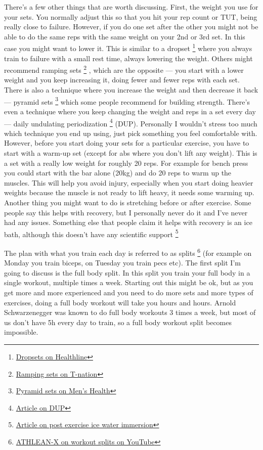 \documentclass[openany, 12pt]{book}
\begin{document}
        There's a few other things that are worth discussing. First, the weight you use for your sets. You normally adjust this so that you hit your rep count or TUT, being really close to failure.
        However, if you do one set after the other you might not be able to do the same reps with the same weight on your 2nd or 3rd set. In this case you might want to lower it. This is similar to
        a dropset
        \footnote{\href{https://www.healthline.com/nutrition/what-is-a-drop-set}{Dropsets on Healthline}}
        where you always train to failure with a small rest time, always lowering the weight. Others might recommend ramping sets
        \footnote{\href{https://www.t-nation.com/training/thibaudeau-on-ramping/}{Ramping sets on T-nation}}
        , which are the opposite --- you start with a lower weight and you keep increasing it, doing fewer and fewer reps with each set. There is also a technique where you increase the weight and then
        decrease it back --- pyramid sets
        \footnote{\href{https://www.menshealth.com/fitness/a36317637/pyramid-sets/}{Pyramid sets on Men's Health}} which some people recommend for building strength. There's even a technique
        where you keep changing the weight and reps in a set every day --- daily undulating periodization
        \footnote{\href{https://pubmed.ncbi.nlm.nih.gov/11991778/}{Article on DUP}} (DUP). Personally I wouldn't stress too
        much which technique you end up using, just pick something you feel comfortable with. However, before you start doing your sets for a particular exercise, you have to start with a warm-up set
        (except for abs where you don't lift any weight).
        This is a set with a really low weight for roughly 20 reps. For example for bench press you could start with the bar alone (20kg) and do 20 reps to warm up the muscles. This will help you avoid
        injury, especially when you start doing heavier weights because the muscle is not ready to lift heavy, it needs some warming up. Another thing you might want to do is stretching before or
        after exercise. Some people say this helps with recovery, but I personally never do it and I've never had any issues. Something else that people claim it helps with recovery is an ice bath,
        although this doesn't have any scientific support
        \footnote{\href{https://www.ncbi.nlm.nih.gov/pmc/articles/PMC2938508/}{Article on post exercise ice water immersion}}

        The plan with what you train each day is referred to as splits
        \footnote{\href{https://www.youtube.com/watch?v=RDWyqnGhmWY}{ATHLEAN-X on workout splits on YouTube}} (for example on Monday you train biceps, on Tuesday you train pecs etc).
        The first split I'm going to discuss is the full body split. In this split
        you train your full body in a single workout, multiple times a week. Starting out this might be ok, but as you get more and more experienced and you need to do more sets and more types of
        exercises, doing a full body workout will take you hours and hours. Arnold Schwarzenegger was known to do full body workouts 3 times a week, but most of us don't have 5h every day to train, so
        a full body workout split becomes impossible.
\end{document}

